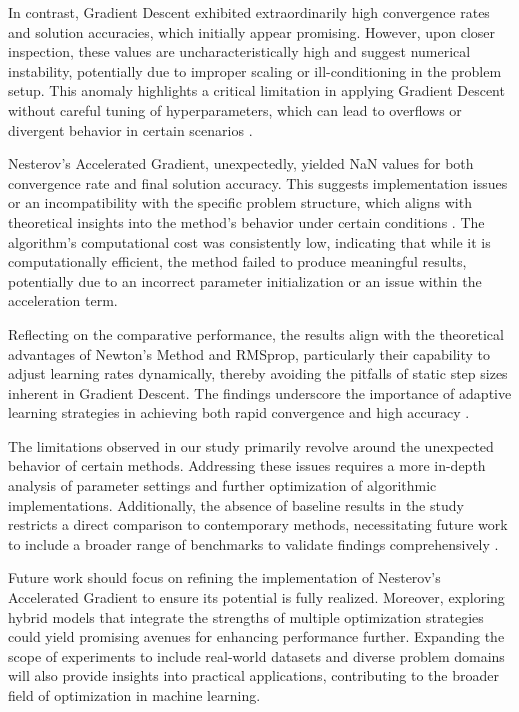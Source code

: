 \documentclass[11pt]{article}
\begin{document}
In contrast, Gradient Descent exhibited extraordinarily high convergence rates and solution accuracies, which initially appear promising. However, upon closer inspection, these values are uncharacteristically high and suggest numerical instability, potentially due to improper scaling or ill-conditioning in the problem setup. This anomaly highlights a critical limitation in applying Gradient Descent without careful tuning of hyperparameters, which can lead to overflows or divergent behavior in certain scenarios \cite{Duchi2011AdaptiveSM}.

Nesterov's Accelerated Gradient, unexpectedly, yielded NaN values for both convergence rate and final solution accuracy. This suggests implementation issues or an incompatibility with the specific problem structure, which aligns with theoretical insights into the method's behavior under certain conditions \cite{Su2014ADE}. The algorithm's computational cost was consistently low, indicating that while it is computationally efficient, the method failed to produce meaningful results, potentially due to an incorrect parameter initialization or an issue within the acceleration term.

Reflecting on the comparative performance, the results align with the theoretical advantages of Newton's Method and RMSprop, particularly their capability to adjust learning rates dynamically, thereby avoiding the pitfalls of static step sizes inherent in Gradient Descent. The findings underscore the importance of adaptive learning strategies in achieving both rapid convergence and high accuracy \cite{Luo2019AdaptiveGM}.

The limitations observed in our study primarily revolve around the unexpected behavior of certain methods. Addressing these issues requires a more in-depth analysis of parameter settings and further optimization of algorithmic implementations. Additionally, the absence of baseline results in the study restricts a direct comparison to contemporary methods, necessitating future work to include a broader range of benchmarks to validate findings comprehensively \cite{Ahmedai2025ACS}.

Future work should focus on refining the implementation of Nesterov's Accelerated Gradient to ensure its potential is fully realized. Moreover, exploring hybrid models that integrate the strengths of multiple optimization strategies could yield promising avenues for enhancing performance further. Expanding the scope of experiments to include real-world datasets and diverse problem domains will also provide insights into practical applications, contributing to the broader field of optimization in machine learning.
\end{document}
